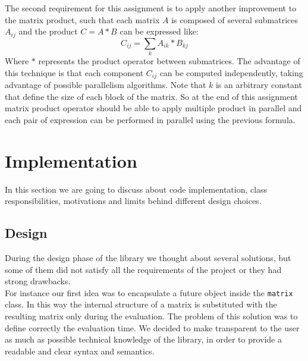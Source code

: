 \documentclass[11pt,a4paper]{article}
\begin{document}
The second requirement for this assignment is to apply another improvement to the matrix product, such that each matrix $A$ is composed of several submatrices $A_{ij}$ and the product $C= A*B$ can be expressed like:
$$C_{ij} = \sum_k A_{ik}*B_{kj}$$
Where $*$ represents the product operator between submatrices. The advantage of this technique is that each component $C_{ij}$ can be computed independently, taking advantage of possible parallelism algorithms. Note that $k$ is an arbitrary constant that define the size of each block of the matrix.
So at the end of this assignment matrix product operator should be able to apply multiple product in parallel and each pair of expression can be performed in parallel using the previous formula.
\newpage
\section{Implementation}
In this section we are going to discuss about code implementation, class responsibilities, motivations and limits behind different design choices.

\subsection{Design}
During the design phase of the library we thought about several solutions, but some of them did not satisfy all the requirements of the project or they had strong drawbacks.\\
For instance our first idea was to encapsulate a future object inside the \verb|matrix| class. In this way the internal structure of a matrix is substituted with the resulting matrix only during the evaluation. The problem of this solution was to define correctly the evaluation time. We decided to make transparent to the user as much as possible technical knowledge of the library, in order to provide a readable and clear syntax and semantics. 
\end{document}
